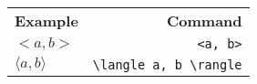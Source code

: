 \documentclass[varwidth,crop]{standalone}
\begin{document}
\begin{tabular}{lr}
    \textbf{Example} & \textbf{Command}\\
    $<a, b>$ & \verb|<a, b>|\\
    $\langle a, b \rangle$ & \verb|\langle a, b \rangle|\\
\end{tabular}
\end{document}
